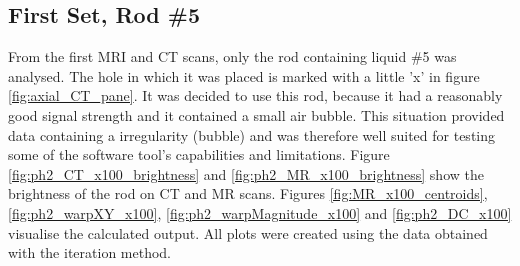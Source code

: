 \subsection{First Set, Rod \#5}
\label{sec:rod5}

From the first MRI and CT scans, only the rod containing liquid \#5 was analysed.
The hole in which it was placed is marked with a little 'x' in figure \ref{fig:axial_CT_pane}.
It was decided to use this rod, because it had a reasonably good signal strength and it contained a small air bubble.
This situation provided data containing a irregularity (bubble) and was therefore well suited for testing some of the software tool's capabilities and limitations.
Figure \ref{fig:ph2_CT_x100_brightness} and \ref{fig:ph2_MR_x100_brightness} show the brightness of the rod on CT and MR scans.
Figures \ref{fig:MR_x100_centroids}, \ref{fig:ph2_warpXY_x100}, \ref{fig:ph2_warpMagnitude_x100} and \ref{fig:ph2_DC_x100} visualise the calculated output.
All plots were created using the data obtained with the iteration method.

